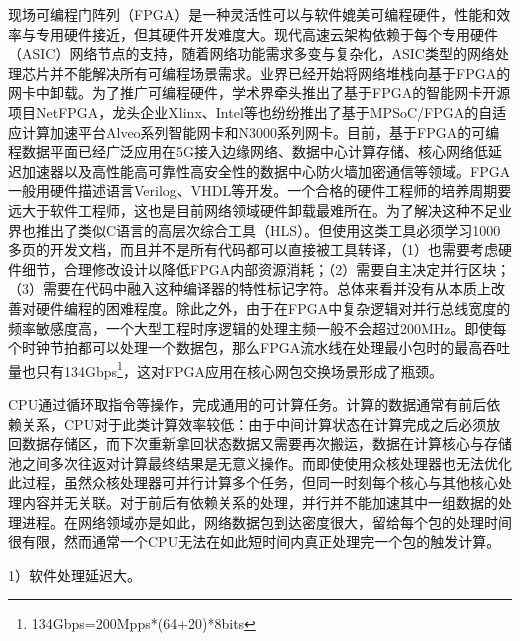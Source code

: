 现场可编程门阵列（FPGA）是一种灵活性可以与软件媲美可编程硬件，性能和效率与专用硬件接近，但其硬件开发难度大。现代高速云架构依赖于每个专用硬件（ASIC）网络节点的支持，随着网络功能需求多变与复杂化，ASIC类型的网络处理芯片并不能解决所有可编程场景需求。业界已经开始将网络堆栈向基于FPGA的网卡中卸载。为了推广可编程硬件，学术界牵头推出了基于FPGA的智能网卡开源项目NetFPGA，龙头企业Xlinx、Intel等也纷纷推出了基于MPSoC/FPGA的自适应计算加速平台Alveo系列智能网卡和N3000系列网卡。目前，基于FPGA的可编程数据平面已经广泛应用在5G接入边缘网络、数据中心计算存储、核心网络低延迟加速器以及高性能高可靠性高安全性的数据中心防火墙加密通信等领域。FPGA一般用硬件描述语言Verilog、VHDL等开发。一个合格的硬件工程师的培养周期要远大于软件工程师，这也是目前网络领域硬件卸载最难所在。为了解决这种不足业界也推出了类似C语言的高层次综合工具（HLS）。但使用这类工具必须学习1000多页的开发文档，而且并不是所有代码都可以直接被工具转译，（1）也需要考虑硬件细节，合理修改设计以降低FPGA内部资源消耗；（2）需要自主决定并行区块；（3）需要在代码中融入这种编译器的特性标记字符。总体来看并没有从本质上改善对硬件编程的困难程度。除此之外，由于在FPGA中复杂逻辑对并行总线宽度的频率敏感度高，一个大型工程时序逻辑的处理主频一般不会超过200MHz。即使每个时钟节拍都可以处理一个数据包，那么FPGA流水线在处理最小包时的最高吞吐量也只有134Gbps\footnote{134Gbps=200Mpps*(64+20)*8bits}，这对FPGA应用在核心网包交换场景形成了瓶颈。





 \label{chap33}


CPU通过循环取指令等操作，完成通用的可计算任务。计算的数据通常有前后依赖关系，CPU对于此类计算效率较低：由于中间计算状态在计算完成之后必须放回数据存储区，而下次重新拿回状态数据又需要再次搬运，数据在计算核心与存储池之间多次往返对计算最终结果是无意义操作。而即使使用众核处理器也无法优化此过程，虽然众核处理器可并行计算多个任务，但同一时刻每个核心与其他核心处理内容并无关联。对于前后有依赖关系的处理，并行并不能加速其中一组数据的处理进程。在网络领域亦是如此，网络数据包到达密度很大，留给每个包的处理时间很有限，然而通常一个CPU无法在如此短时间内真正处理完一个包的触发计算。


1）软件处理延迟大。

